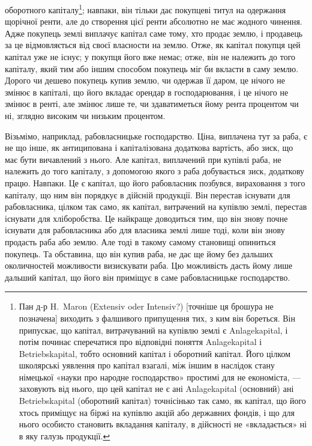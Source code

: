 \parcont{}  %
оборотного капіталу\footnote{
Пан д-р H.~Maron (Extensiv oder Intensiv?) [точніше ця брошура не позначена] виходить з
фалшивого припущення тих, з ким він бореться. Він припускає, що капітал, витрачуваний на купівлю
землі є Anlagekapital, і потім починає сперечатися про відповідні поняття Anlagekapital і
Betriebskapital, тобто основний капітал і оборотний капітал. Його цілком школярські уявлення про
капітал взагалі, між іншим в наслідок стану німецької «науки про народне господарство» простимі для
не економіста, — заховують від нього, що цей капітал не є ані Anlagekapital (основний) ані
Betriebskapital
(оборотний капітал) точнісінько так само, як капітал, що його хтось приміщує на біржі на купівлю
акцій або державних фондів, і що для нього особисто становить вкладання капіталу, в дійсності не
«вкладається» ні в яку галузь продукції.
}; навпаки, він тільки дає покупцеві титул на одержання
щорічної ренти, але до створення цієї ренти абсолютно не має жодного чинення.
Адже покупець землі виплачує капітал саме тому, хто продає землю, і продавець
за це відмовляється від своєї власности на землю. Отже, як капітал покупця
цей капітал уже не існує; у покупця його вже немає; отже, він не належить
до того капіталу, який тим або іншим способом покупець міг би вкласти
в саму землю. Дорого чи дешево покупець купив землю, чи одержав її даром,
це нічого не змінює в капіталі, що його вкладає орендар в господарювання, і
це нічого не змінює в ренті, але змінює лише те, чи здаватиметься йому рента
процентом чи ні, зглядно високим чи низьким процентом.

Візьмімо, наприклад, рабовласницьке господарство. Ціна, виплачена тут
за раба, є не що інше, як антиципована і капіталізована додаткова вартість,
або зиск, що має бути вичавлений з нього. Але капітал, виплачений при купівлі
раба, не належить до того капіталу, з допомогою якого з раба добувається
зиск, додаткову працю. Навпаки. Це є капітал, що його рабовласник позбувся,
вираховання з того капіталу, що ним він порядкує в дійсній продукції. Він
перестав існувати для рабовласника, цілком так само, як капітал, витрачений
на купівлю землі, перестав існувати для хліборобства. Це найкраще доводиться
тим, що він знову почне існувати для рабовласника або для власника землі
лише тоді, коли він знову продасть раба або землю. Але тоді в такому самому
становищі опиниться покупець. Та обставина, що він купив раба, не дає ще
йому без дальших околичностей можливости визискувати раба. Цю можливість
дасть йому лише дальший капітал, що його він приміщує в саме рабовласницьке
господарство.


